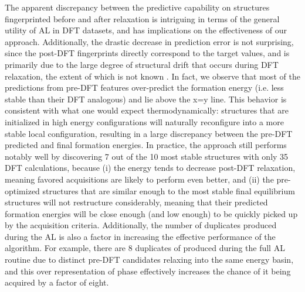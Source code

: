 %
%
The apparent discrepancy between the predictive capability on structures fingerprinted before and after relaxation is intriguing in terms of the general utility of AL in DFT datasets,
and has implications on the effectiveness of our approach.
%
Additionally, the drastic decrease in prediction error is not surprising,
since the post-DFT fingerprints directly correspond to the target \DHf values,
and is primarily due to the large degree of structural drift that occurs during DFT relaxation,
the extent of which is not known .
%
In fact, we observe that most of the predictions from pre-DFT features over-predict the formation energy (i.e. less stable than their DFT analogous) and lie above the x=y line.
%
This behavior is consistent with what one would expect thermodynamically:
structures that are initialized in high energy configurations will  naturally reconfigure into a more stable local configuration,
resulting in a large discrepancy between the pre-DFT predicted and final formation energies.
%
In practice, the approach still performs notably well by discovering 7 out of the 10 most stable structures with only 35 DFT calculations, because (i) the energy tends to decrease post-DFT relaxation,
meaning favored acquisitions are likely to perform even better,
and (ii) the pre-optimized structures that are similar enough to the most stable final equilibrium structures will not restructure considerably,
meaning that their predicted formation energies will be close enough (and low enough) to be quickly picked up by the acquisition criteria.
%
Additionally, the number of duplicates produced during the AL is also a factor in increasing the effective performance of the algorithm.
%
For example, there are \num{8} duplicates of \aIrOthree produced during the full AL routine due to distinct pre-DFT candidates relaxing into the same energy basin,
and this over representation of \aIrOthree phase effectively increases the chance of it being acquired by a factor of eight.


